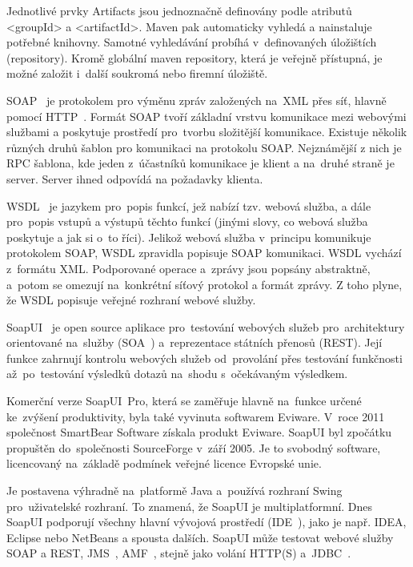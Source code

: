 Jednotlivé prvky Artifacts jsou jednoznačně definovány podle atributů <groupId> a <artifactId>. Maven pak automaticky vyhledá a nainstaluje potřebné knihovny. Samotné vyhledávání probíhá v~definovaných úložištích (repository). Kromě globální maven repository, která je veřejně přístupná, je možné založit i~další soukromá nebo firemní úložiště.

SOAP~\cite{soap} je protokolem pro výměnu zpráv založených na~XML přes síť, hlavně pomocí HTTP~\cite{http}. Formát SOAP tvoří základní vrstvu komunikace mezi webovými službami a poskytuje prostředí pro~tvorbu složitější komunikace. Existuje několik různých druhů šablon pro komunikaci na protokolu SOAP. Nejznámější z nich je RPC šablona, kde jeden z~účastníků komunikace je klient a na~druhé straně je server. Server ihned odpovídá na požadavky klienta.

WSDL~\cite{wsdl} je jazykem pro~popis funkcí, jež nabízí tzv. webová služba, a dále pro~popis vstupů a výstupů těchto funkcí (jinými slovy, co webová služba poskytuje a jak si o~to říci). Jelikož webová služba v~principu komunikuje protokolem SOAP, WSDL zpravidla popisuje SOAP komunikaci. WSDL vychází z~formátu XML. Podporované operace a~zprávy jsou popsány abstraktně, a~potom se omezují na~konkrétní síťový protokol a formát zprávy. Z toho plyne, že WSDL popisuje veřejné rozhraní webové služby.

SoapUI~\cite{soapui} je open source aplikace pro~testování webových služeb pro~architektury orientované na~služby (SOA~\cite{soa}) a~reprezentace státních přenosů (REST). Její funkce zahrnují kontrolu webových služeb od~provolání přes testování funkčnosti až~po~testování výsledků dotazů na~shodu s~očekávaným výsledkem.

Komerční verze SoapUI~Pro, která se zaměřuje hlavně na~funkce určené ke~zvýšení produktivity, byla také vyvinuta softwarem Eviware. V~roce 2011 společnost SmartBear Software získala produkt Eviware. SoapUI byl zpočátku propuštěn do~společnosti SourceForge v~září 2005. Je to svobodný software, licencovaný na~základě podmínek veřejné licence Evropské unie. 

Je postavena výhradně na~platformě Java a~používá rozhraní Swing pro~uživatelské rozhraní. To znamená, že SoapUI je multiplatformní. Dnes SoapUI podporují všechny hlavní vývojová prostředí (IDE~\cite{ide}), jako je např. IDEA, Eclipse nebo NetBeans a spousta dalších. SoapUI může testovat webové služby SOAP a REST, JMS~\cite{jms}, AMF~\cite{amf}, stejně jako volání HTTP(S) a~JDBC~\cite{jdbc}.

